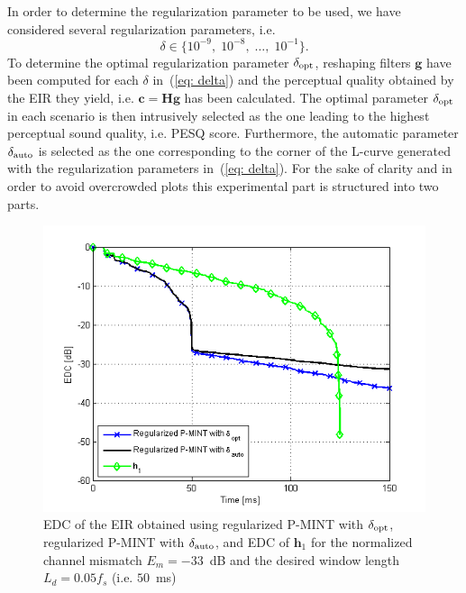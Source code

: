 \documentclass{article}
\begin{document}
In order to determine the regularization parameter to be used, we have considered several regularization parameters, i.e. 
\begin{equation}
\label{eq: delta}
 \delta \in \{10^{-9}, \;10^{-8}, \;  \ldots, \; 10^{-1} \}.
\end{equation}
To determine the optimal regularization parameter $\delta_{\rm opt}$, reshaping filters $\mathbf{g}$ have been computed for each $\delta$ in~(\ref{eq: delta}) and the perceptual quality obtained by the EIR they yield, i.e. $\mathbf{c} = \mathbf{H}\mathbf{g}$ has been calculated.
The optimal parameter $\delta_{\rm opt}$ in each scenario is then intrusively selected as the one leading to the highest perceptual sound quality, i.e. PESQ score. 
Furthermore, the automatic parameter $\delta_{\rm auto}$ is selected as the one corresponding to the corner of the L-curve generated with the regularization parameters in~(\ref{eq: delta}).
For the sake of clarity and in order to avoid overcrowded plots this experimental part is structured into two parts. 
\begin{figure}[t!]
\centering
\includegraphics[scale = 0.6]{Plots/EDC_optauto_5_Cm_-33_Ld_800}
\caption{EDC of the EIR obtained using regularized P-MINT with $\delta_{\rm opt}$, regularized P-MINT with $\delta_{\rm auto}$, and EDC of $\mathbf{h}_1$ for the normalized channel mismatch $E_m = -33$~dB and the desired window length $L_d = 0.05f_s$ (i.e. $50$~ms)}
\label{fig: edcoptauto}
\end{figure}
\end{document}

